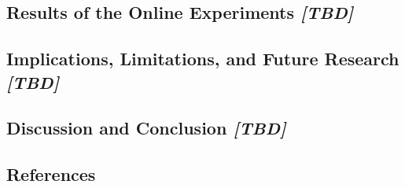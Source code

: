 \documentclass[
]{article}
\begin{document}
\hypertarget{results-of-the-online-experiments-tbd}{%
\subsection{\texorpdfstring{Results of the Online Experiments
\emph{{[}TBD{]}}}{Results of the Online Experiments {[}TBD{]}}}\label{results-of-the-online-experiments-tbd}}

\hypertarget{implications-limitations-and-future-research-tbd}{%
\subsection{\texorpdfstring{Implications, Limitations, and Future
Research
\emph{{[}TBD{]}}}{Implications, Limitations, and Future Research {[}TBD{]}}}\label{implications-limitations-and-future-research-tbd}}

\hypertarget{discussion-and-conclusion-tbd}{%
\subsection{\texorpdfstring{Discussion and Conclusion
\emph{{[}TBD{]}}}{Discussion and Conclusion {[}TBD{]}}}\label{discussion-and-conclusion-tbd}}

\singlespacing

\hypertarget{references}{%
\subsection{References}\label{references}}
\end{document}
